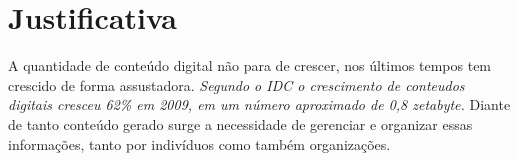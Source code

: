 \chapter{Justificativa}
 
A quantidade  de conteúdo digital não para de crescer, nos últimos tempos tem crescido de forma assustadora. \emph{Segundo o IDC o crescimento de conteudos digitais cresceu 62\% em 2009, em um número aproximado de 0,8 zetabyte.} Diante de tanto conteúdo gerado surge a necessidade de gerenciar e organizar essas informações, tanto por indivíduos como também organizações. 




    
